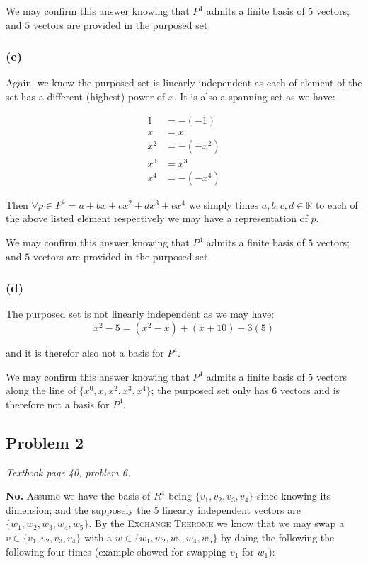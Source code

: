 \documentclass[11pt]{article}
\begin{document}
We may confirm this answer knowing that $P^4$ admits a finite basis of $5$ vectors; and $5$ vectors are provided in the purposed set.

\subsubsection*{(c)}

Again, we know the purposed set is linearly independent as each of element of the set has a different (highest) power of $x$. It is also a spanning set as we have:

\begin{align*}
    1 &= -(-1) \\
    x &= x \\
    x^2 &= -(-x^2) \\
    x^3 &= x^3 \\
    x^4 &= -(-x^4)
\end{align*}

Then $\forall p \in P^4 = a + bx + cx^2 + dx^3 + ex^4$ we simply times $a, b, c, d \in \mathbb{R}$ to each of the above listed element respectively we may have a representation of $p$.

We may confirm this answer knowing that $P^4$ admits a finite basis of $5$ vectors; and $5$ vectors are provided in the purposed set.

\subsubsection*{(d)}

The purposed set is not linearly independent as we may have:
\begin{equation*}
    x^2 - 5 = (x^2 - x) + (x + 10) - 3(5)
\end{equation*}

and it is therefor also not a basis for $P^4$.

We may confirm this answer knowing that $P^4$ admits a finite basis of $5$ vectors along the line of $\{x^0, x, x^2, x^3, x^4 \}$; the purposed set only has $6$ vectors and is therefore not a basis for $P^4$.

\subsection*{Problem 2}
\textit{Textbook page 40, problem 6.}\newline

\textbf{No.} Assume we have the basis of $R^4$ being $\{v_1, v_2, v_3, v_4\}$ since knowing its dimension; and the supposely the 5 linearly independent vectors are $\{w_1, w_2, w_3, w_4, w_5 \}$. By the \textsc{Exchange Therome} we know that we may swap a $v \in \{v_1, v_2, v_3, v_4\}$ with a $w \in \{w_1, w_2, w_3, w_4, w_5 \}$ by doing the following the following four times (example showed for swapping $v_1$ for $w_1$):
\end{document}
